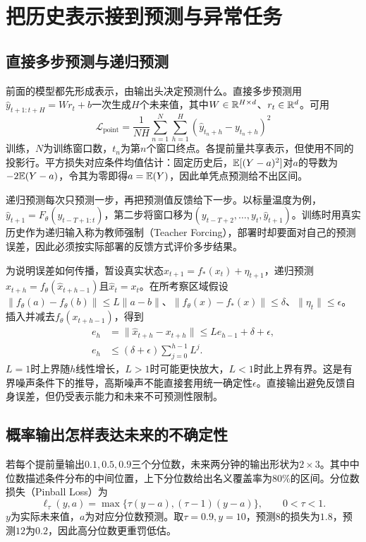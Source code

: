 \section{把历史表示接到预测与异常任务}
\subsection{直接多步预测与递归预测}
\label{sec:sequence-direct-recursive}
前面的模型都先形成表示，由输出头决定预测什么。直接多步预测用$\hat y_{t+1:t+H}=Wr_t+b$一次生成$H$个未来值，其中$W\in\mathbb{R}^{H\times d}$、$r_t\in\mathbb{R}^d$。可用
\begin{equation}
 \mathcal L_{\mathrm{point}}=\frac{1}{NH}\sum_{n=1}^N\sum_{h=1}^H(\hat y_{t_n+h}-y_{t_n+h})^2
\end{equation}
训练，$N$为训练窗口数，$t_n$为第$n$个窗口终点。各提前量共享表示，但使用不同的投影行。平方损失对应条件均值估计：固定历史后，$\mathbb{E}[(Y-a)^2]$对$a$的导数为$-2\mathbb{E}(Y-a)$，令其为零即得$a=\mathbb{E}(Y)$，因此单凭点预测给不出区间。

递归预测每次只预测一步，再把预测值反馈给下一步。以标量温度为例，$\hat y_{t+1}=F_\theta(y_{t-T+1:t})$，第二步将窗口移为$(y_{t-T+2},\ldots,y_t,\hat y_{t+1})$。训练时用真实历史作为递归输入称为教师强制（Teacher Forcing），部署时却要面对自己的预测误差，因此必须按实际部署的反馈方式评价多步结果。

为说明误差如何传播，暂设真实状态$x_{t+1}=f_*(x_t)+\eta_{t+1}$，递归预测$\hat x_{t+h}=f_\theta(\hat x_{t+h-1})$且$\hat x_t=x_t$。在所考察区域假设$\|f_\theta(a)-f_\theta(b)\|\leq L\|a-b\|$、$\|f_\theta(x)-f_*(x)\|\leq\delta$、$\|\eta_t\|\leq\epsilon$。插入并减去$f_\theta(x_{t+h-1})$，得到
\begin{align}
 e_h&=\|\hat x_{t+h}-x_{t+h}\|\leq Le_{h-1}+\delta+\epsilon,\\
 e_h&\leq(\delta+\epsilon)\sum_{j=0}^{h-1}L^j.
\end{align}
$L=1$时上界随$h$线性增长，$L>1$时可能更快放大，$L<1$时此上界有界。这是有界噪声条件下的推导，高斯噪声不能直接套用统一确定性$\epsilon$。直接输出避免反馈自身误差，但仍受表示能力和未来不可预测性限制。

\subsection{概率输出怎样表达未来的不确定性}
\label{sec:sequence-probabilistic}
若每个提前量输出$0.1,0.5,0.9$三个分位数，未来两分钟的输出形状为$2\times3$。其中中位数描述条件分布的中间位置，上下分位数给出名义覆盖率为$80\%$的区间。分位数损失（Pinball Loss）为
\begin{equation}
 \ell_\tau(y,a)=\max\{\tau(y-a),(\tau-1)(y-a)\},\qquad 0<\tau<1.
\end{equation}
$y$为实际未来值，$a$为对应分位数预测。取$\tau=0.9,y=10$，预测$8$的损失为$1.8$，预测$12$为$0.2$，因此高分位数更重罚低估。

